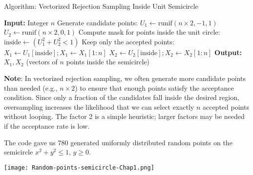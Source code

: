 \documentclass[8pt]{beamer}
\begin{document}
\begin{frame}[fragile]{Algorithm: Vectorized Rejection Sampling Inside Unit Semicircle}
\begin{algorithm}[H]
    \caption{Generate $n$ points $(X_1, X_2)$ uniformly inside the semicircle (vectorized)}
    \begin{algorithmic}[1]
        \State \textbf{Input:} Integer $n$
        \State Generate candidate points:
        \Statex \quad $U_1 \gets \text{runif}(n \times 2, -1, 1)$
        \Statex \quad $U_2 \gets \text{runif}(n \times 2, 0, 1)$
        \State Compute mask for points inside the unit circle:
        \Statex \quad $\text{inside} \gets (U_1^2 + U_2^2 < 1)$
        \State Keep only the accepted points:
        \Statex \quad $X_1 \gets U_1[\text{inside}]; X_1 \gets X_1[1:n]$
        \Statex \quad $X_2 \gets U_2[\text{inside}]; X_2 \gets X_2[1:n]$
        \State \textbf{Output:} $X_1, X_2$ (vectors of $n$ points inside the semicircle)
    \end{algorithmic}
\end{algorithm}

\textbf{Note}: In vectorized rejection sampling, we often generate more candidate points than needed (e.g., $n\times 2$) to ensure that enough points satisfy the acceptance condition. Since only a fraction of the candidates fall inside the desired region, oversampling increases the likelihood that we can select exactly $n$ accepted points without looping. The factor 2 is a simple heuristic; larger factors may be needed if the acceptance rate is low.
\end{frame}

\begin{frame}
The code gave us 780 generated uniformly distributed random points on the semicircle $x^2+y^2\leq 1$, $y\geq 0$. 

\begin{center}
\texttt{[image: Random-points-semicircle-Chap1.png]}
\end{center}
\end{frame}
\end{document}
